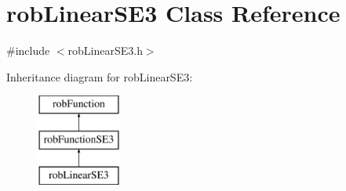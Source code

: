 \hypertarget{classrob_linear_s_e3}{}\section{rob\+Linear\+S\+E3 Class Reference}
\label{classrob_linear_s_e3}


{\ttfamily \#include $<$rob\+Linear\+S\+E3.\+h$>$}

Inheritance diagram for rob\+Linear\+S\+E3\+:\begin{figure}[H]
\begin{center}
\leavevmode
\includegraphics[height=3.000000cm]{d5/d09/classrob_linear_s_e3}
\end{center}
\end{figure}
